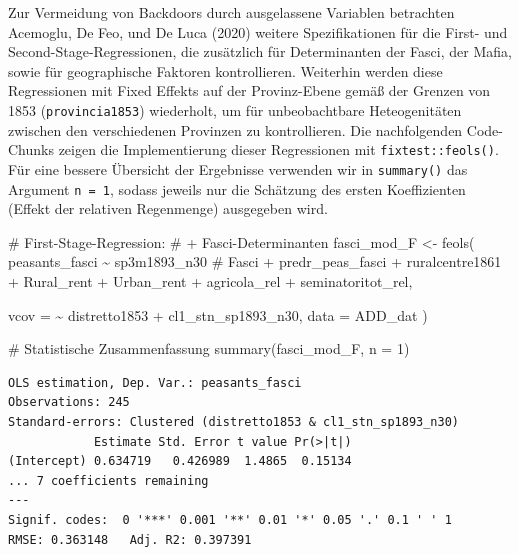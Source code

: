 \documentclass[
  a4paper,
  DIV=11,
  oneside]{scrreprt}
\newenvironment{Shaded}{\begin{snugshade}}{\end{snugshade}}
\newcommand{\AttributeTok}[1]{\textcolor[rgb]{0.40,0.45,0.13}{#1}}
\newcommand{\CommentTok}[1]{\textcolor[rgb]{0.37,0.37,0.37}{#1}}
\newcommand{\DecValTok}[1]{\textcolor[rgb]{0.68,0.00,0.00}{#1}}
\newcommand{\FunctionTok}[1]{\textcolor[rgb]{0.28,0.35,0.67}{#1}}
\newcommand{\NormalTok}[1]{\textcolor[rgb]{0.00,0.23,0.31}{#1}}
\newcommand{\OtherTok}[1]{\textcolor[rgb]{0.00,0.23,0.31}{#1}}
\newcommand{\SpecialCharTok}[1]{\textcolor[rgb]{0.37,0.37,0.37}{#1}}
\begin{document}
Zur Vermeidung von Backdoors durch ausgelassene Variablen betrachten
Acemoglu, De Feo, und De Luca (2020) weitere Spezifikationen für die
First- und Second-Stage-Regressionen, die zusätzlich für Determinanten
der Fasci, der Mafia, sowie für geographische Faktoren kontrollieren.
Weiterhin werden diese Regressionen mit Fixed Effekts auf der
Provinz-Ebene gemäß der Grenzen von 1853 (\texttt{provincia1853})
wiederholt, um für unbeobachtbare Heteogenitäten zwischen den
verschiedenen Provinzen zu kontrollieren. Die nachfolgenden Code-Chunks
zeigen die Implementierung dieser Regressionen mit
\texttt{fixtest::feols()}. Für eine bessere Übersicht der Ergebnisse
verwenden wir in \texttt{summary()} das Argument \texttt{n\ =\ 1},
sodass jeweils nur die Schätzung des ersten Koeffizienten (Effekt der
relativen Regenmenge) ausgegeben wird.

\begin{Shaded}
\begin{Highlighting}[]
\CommentTok{\# First{-}Stage{-}Regression:}
\CommentTok{\# + Fasci{-}Determinanten}
\NormalTok{fasci\_mod\_F }\OtherTok{\textless{}{-}} \FunctionTok{feols}\NormalTok{(}
\NormalTok{  peasants\_fasci }\SpecialCharTok{\textasciitilde{}} 
\NormalTok{    sp3m1893\_n30 }
    \CommentTok{\# Fasci}
  \SpecialCharTok{+}\NormalTok{ predr\_peas\_fasci}
  \SpecialCharTok{+}\NormalTok{ ruralcentre1861}
  \SpecialCharTok{+}\NormalTok{ Rural\_rent}
  \SpecialCharTok{+}\NormalTok{ Urban\_rent}
  \SpecialCharTok{+}\NormalTok{ agricola\_rel}
  \SpecialCharTok{+}\NormalTok{ seminatoritot\_rel,}
  
  \AttributeTok{vcov =} \SpecialCharTok{\textasciitilde{}}\NormalTok{ distretto1853 }\SpecialCharTok{+}\NormalTok{ cl1\_stn\_sp1893\_n30,}
  \AttributeTok{data =}\NormalTok{ ADD\_dat }
\NormalTok{  ) }

\CommentTok{\# Statistische Zusammenfassung}
\FunctionTok{summary}\NormalTok{(fasci\_mod\_F, }\AttributeTok{n =} \DecValTok{1}\NormalTok{)}
\end{Highlighting}
\end{Shaded}

\begin{verbatim}
OLS estimation, Dep. Var.: peasants_fasci
Observations: 245
Standard-errors: Clustered (distretto1853 & cl1_stn_sp1893_n30) 
            Estimate Std. Error t value Pr(>|t|) 
(Intercept) 0.634719   0.426989  1.4865  0.15134 
... 7 coefficients remaining
---
Signif. codes:  0 '***' 0.001 '**' 0.01 '*' 0.05 '.' 0.1 ' ' 1
RMSE: 0.363148   Adj. R2: 0.397391
\end{verbatim}
\end{document}
